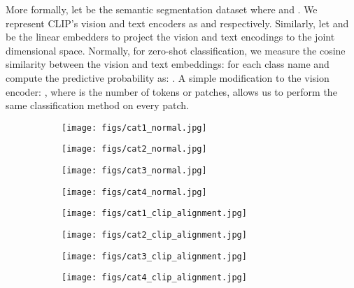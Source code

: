 \documentclass[10pt,twocolumn,letterpaper]{article}
\begin{document}
More formally, let  be the semantic segmentation dataset where  and . We represent CLIP's vision and text encoders as  and  respectively. Similarly, let  and  be the linear embedders to project the vision and text encodings to the joint  dimensional space. Normally, for zero-shot classification, we measure the cosine similarity between the vision and text embeddings:  for each class name  and compute the predictive probability as: . A simple modification to the vision encoder: , where  is the number of tokens or patches, allows us to perform the same classification method on every patch.

\begin{figure}[!t]
\centering
    \begin{subfigure}{0.25\linewidth}
        \centering
        \texttt{[image: figs/cat1\_normal.jpg]}
        \vspace{-4mm}
    \end{subfigure}
    \begin{subfigure}{0.25\linewidth}
        \centering
        \texttt{[image: figs/cat2\_normal.jpg]}
        \vspace{-4mm}
    \end{subfigure}
    \begin{subfigure}{0.28\linewidth}
        \centering
        \texttt{[image: figs/cat3\_normal.jpg]}
        \vspace{-4mm}
    \end{subfigure}
    \begin{subfigure}{0.14\linewidth}
        \centering
        \texttt{[image: figs/cat4\_normal.jpg]}
        \vspace{-4mm}
    \end{subfigure}

    \begin{subfigure}{0.25\linewidth}
        \centering
        \texttt{[image: figs/cat1\_clip\_alignment.jpg]}
        \vspace{-4mm}
    \end{subfigure}
    \begin{subfigure}{0.25\linewidth}
        \centering
        \texttt{[image: figs/cat2\_clip\_alignment.jpg]}
        \vspace{-4mm}
    \end{subfigure}
    \begin{subfigure}{0.28\linewidth}
        \centering
        \texttt{[image: figs/cat3\_clip\_alignment.jpg]}
        \vspace{-4mm}
    \end{subfigure}
    \begin{subfigure}{0.14\linewidth}
        \centering
        \texttt{[image: figs/cat4\_clip\_alignment.jpg]}
        \vspace{-4mm}
    \end{subfigure}


\end{figure}
\end{document}
